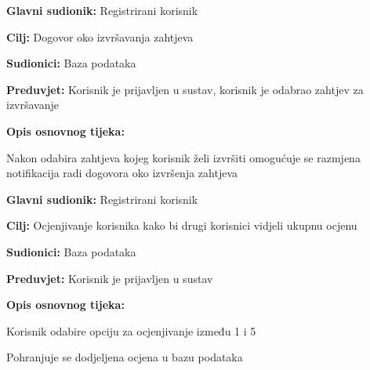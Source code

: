 \noindent {}
\begin{packed_item}
	
	\item \textbf{Glavni sudionik: } Registrirani korisnik
	\item  \textbf{Cilj:} Dogovor oko izvršavanja zahtjeva
	\item  \textbf{Sudionici:} Baza podataka
	\item  \textbf{Preduvjet:} Korisnik je prijavljen u sustav, korisnik je odabrao zahtjev za izvršavanje
	\item  \textbf{Opis osnovnog tijeka:}
	
	\item[] \begin{packed_enum}
		
		\item Nakon odabira zahtjeva kojeg korisnik želi izvršiti omogućuje se razmjena notifikacija radi dogovora oko izvršenja zahtjeva 
		
	\end{packed_enum}
	
\end{packed_item}

\noindent {}
\begin{packed_item}
	
	\item \textbf{Glavni sudionik: } Registrirani korisnik
	\item  \textbf{Cilj:} Ocjenjivanje korisnika kako bi drugi korisnici vidjeli ukupnu ocjenu  
	\item  \textbf{Sudionici:} Baza podataka
	\item  \textbf{Preduvjet:} Korisnik je prijavljen u sustav
	\item  \textbf{Opis osnovnog tijeka:}
	
	\item[] \begin{packed_enum}
		
		\item Korisnik odabire opciju za ocjenjivanje između 1 i 5
		\item Pohranjuje se dodjeljena ocjena u bazu podataka
	\end{packed_enum}
	
\end{packed_item}

